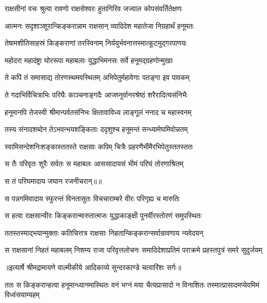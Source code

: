 \twolineshloka
{राक्षसीनां वचः श्रुत्वा रावणो राक्षसेश्वरः}
{हुतागिरिव जज्वाल कोपसंवर्तितेक्षणः} %

\twolineshloka
{आत्मनः सदृशाञ्शूरान्किङ्करान्नाम राक्षसान्}
{व्यादिदेश महातेजा निग्रहार्थं हनूमतः} %

\twolineshloka
{तेषामशीतिसाहस्रं किङ्कराणां तरस्विनाम्}
{निर्ययुर्भवनात्तस्मात्कूटमुद्गरपाणयः} %

\twolineshloka
{महोदरा महादंष्ट्रा घोररूपा महाबलाः}
{युद्धाभिमनसः सर्वे हनूमद्ग्रहणोन्मुखाः} %

\twolineshloka
{ते कपिं तं समासाद्य तोरणस्थमवस्थितम्}
{अभिपेतुर्महावेगाः पतङ्गा इव पावकम्} %

\twolineshloka
{ते गदाभिर्विचित्राभिः परिघैः काञ्चनाङ्गदैः}
{आजघ्नुर्वानरश्रेष्ठं शरैरादित्यसंनिभैः} %

\twolineshloka
{हनूमानपि तेजस्वी श्रीमान्पर्वतसंनिभः}
{क्षितावाविध्य लाङ्गूलं ननाद च महास्वनम्} %

\twolineshloka
{तस्य संनादशब्देन तेऽभवन्भयशङ्किताः}
{ददृशुश्च हनूमन्तं सन्ध्यामेघमिवोन्नतम्} %

\twolineshloka
{स्वामिसन्देशनिःशङ्कास्ततस्ते राक्षसाः कपिम्}
{चित्रैः प्रहरणैर्भीमैरभिपेतुस्ततस्ततः} %

\twolineshloka
{स तैः परिवृतः शूरैः सर्वतः स महाबलः}
{आससादायसं भीमं परिघं तोरणाश्रितम्} %

{स तं परिघमादाय जघान रजनीचरान्॥॥} %

\addtocounter{shlokacount}{1}

\twolineshloka
{स पन्नगमिवादाय स्फुरन्तं विनतासुतः}
{विचचाराम्बरे वीरः परिगृह्य च मारुतिः} %

\twolineshloka
{स हत्वा राक्षसान्वीरः किङ्करान्मारुतात्मजः}
{युद्धाकाङ्क्षी पुनर्वीरस्तोरणं समुपस्थितः} %

\twolineshloka
{ततस्तस्माद्भयान्मुक्ताः कतिचित्तत्र राक्षसाः}
{निहतान्किङ्करान्सर्वान्रावणाय न्यवेदयन्} %

\fourlineindentedshloka
{स राक्षसानां निहतं महाबलम्}
{निशम्य राजा परिवृत्तलोचनः}
{समादिदेशाप्रतिमं पराक्रमे}
{प्रहस्तपुत्रं समरे सुदुर्जयम्} %


{॥इत्यार्षे श्रीमद्रामायणे वाल्मीकीये आदिकाव्ये सुन्दरकाण्डे चत्वारिंशः सर्गः॥}


\threelineshloka
{ततः स किङ्करान्हत्वा हनूमान्ध्यानमास्थितः}
{वनं भग्नं मया चैत्यप्रासादो न विनाशितः}
{तस्मात्प्रासादमप्येवमिमं विध्वंसयाम्यहम्} %

